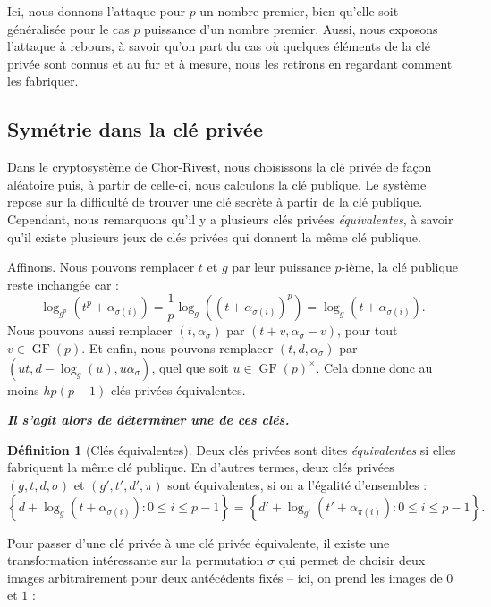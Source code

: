 \documentclass[a4paper, titlepage, 11pt]{article}
\theoremstyle{definition}
\newtheorem{defi}[theo]{Définition}
\theoremstyle{remark}
\def\gf{\operatorname{GF}}
\begin{document}
Ici, nous donnons l'attaque pour $p$ un nombre premier, bien qu'elle soit généralisée pour le cas $p$ puissance d'un nombre premier. Aussi, nous exposons l'attaque à rebours, à savoir qu'on part du cas où quelques éléments de la clé privée sont connus et au fur et à mesure, nous les retirons en regardant comment les fabriquer.

\subsection*{Symétrie dans la clé privée}

Dans le cryptosystème de Chor-Rivest, nous choisissons la clé privée de façon aléatoire puis, à partir de celle-ci, nous calculons la clé publique. Le système repose sur la difficulté de trouver une clé secrète à partir de la clé publique. Cependant, nous remarquons qu'il y a plusieurs clés privées \textit{équivalentes}, à savoir qu'il existe plusieurs jeux de clés privées qui donnent la même clé publique.

Affinons. Nous pouvons remplacer $t$ et $g$ par leur puissance $p$-ième, la clé publique reste inchangée car :
$$\log_{g^p}\left(t^p + \alpha_{\sigma(i)}\right) = \frac{1}{p}\log_{g}\left(\left(t + \alpha_{\sigma(i)}\right)^p\right) = \log_{g}\left(t + \alpha_{\sigma(i)}\right).$$
Nous pouvons aussi remplacer $(t, \alpha_{\sigma})$ par $(t + v, \alpha_{\sigma} - v)$, pour tout $v \in \gf(p)$. Et enfin, nous pouvons remplacer $(t,d,\alpha_\sigma)$ par $(ut, d - \log_g(u), u\alpha_\sigma)$, quel que soit $u \in \gf(p)^\times$.
Cela donne donc au moins $hp(p-1)$ clés privées équivalentes. 

\textit{\textbf{Il s'agit alors de déterminer une de ces clés.}}


\begin{defi}[Clés équivalentes]
Deux clés privées sont dites \textit{équivalentes} si elles fabriquent la même clé publique. En d'autres termes, deux clés privées $(g,t,d,\sigma)$ et $(g',t',d',\pi)$ sont équivalentes, si on a l'égalité d'ensembles :
$$\left\{d + \log_g(t + \alpha_{\sigma(i)}) : 0\leqslant i \leqslant p-1\right\} = \left\{d' + \log_{g'}(t' + \alpha_{\pi(i)}) : 0\leqslant i \leqslant p-1\right\}.$$
\end{defi}

Pour passer d'une clé privée à une clé privée équivalente, il existe une transformation intéressante sur la permutation $\sigma$ qui permet de choisir deux images arbitrairement pour deux antécédents fixés -- ici, on prend les images de $0$ et $1$ :
\end{document}
